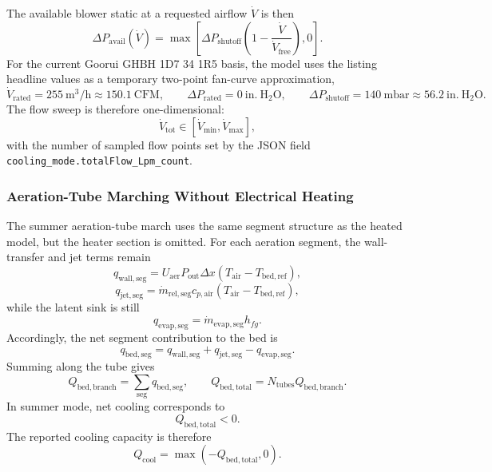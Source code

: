 \documentclass{article}
\begin{document}
The available blower static at a requested airflow $\dot V$ is then
\begin{equation}
\Delta P_{\mathrm{avail}}(\dot V)
=
\max\!\left[
\Delta P_{\mathrm{shutoff}}
\left(1-\frac{\dot V}{\dot V_{\mathrm{free}}}\right),0
\right].
\end{equation}
For the current Goorui GHBH 1D7 34 1R5 basis, the model uses the listing headline values as
a temporary two-point fan-curve approximation,
\begin{equation}
\dot V_{\mathrm{rated}} = 255 \ \mathrm{m^3/h} \approx 150.1 \ \mathrm{CFM},
\qquad
\Delta P_{\mathrm{rated}} = 0 \ \mathrm{in.\ H_2O},
\qquad
\Delta P_{\mathrm{shutoff}} = 140 \ \mathrm{mbar} \approx 56.2 \ \mathrm{in.\ H_2O}.
\end{equation}
The flow sweep is therefore one-dimensional:
\begin{equation}
\dot V_{\mathrm{tot}} \in
\left[\dot V_{\min}, \dot V_{\max}\right],
\end{equation}
with the number of sampled flow points set by the JSON field
\texttt{cooling\_mode.totalFlow\_Lpm\_count}.

\subsubsection{Aeration-Tube Marching Without Electrical Heating}

The summer aeration-tube march uses the same segment structure as the heated
model, but the heater section is omitted. For each aeration segment, the
wall-transfer and jet terms remain
\begin{equation}
q_{\mathrm{wall,seg}}
= U_{\mathrm{aer}} P_{\mathrm{out}} \Delta x
\left(T_{\mathrm{air}} - T_{\mathrm{bed,ref}}\right),
\end{equation}
\begin{equation}
q_{\mathrm{jet,seg}}
= \dot m_{\mathrm{rel,seg}} c_{p,\mathrm{air}}
\left(T_{\mathrm{air}} - T_{\mathrm{bed,ref}}\right),
\end{equation}
while the latent sink is still
\begin{equation}
q_{\mathrm{evap,seg}}
= \dot m_{\mathrm{evap,seg}} h_{fg}.
\end{equation}
Accordingly, the net segment contribution to the bed is
\begin{equation}
q_{\mathrm{bed,seg}}
= q_{\mathrm{wall,seg}} + q_{\mathrm{jet,seg}} - q_{\mathrm{evap,seg}}.
\end{equation}
Summing along the tube gives
\begin{equation}
Q_{\mathrm{bed,branch}}
= \sum_{\mathrm{seg}} q_{\mathrm{bed,seg}},
\qquad
Q_{\mathrm{bed,total}} = N_{\mathrm{tubes}} Q_{\mathrm{bed,branch}}.
\end{equation}
In summer mode, net cooling corresponds to
\begin{equation}
Q_{\mathrm{bed,total}} < 0.
\end{equation}
The reported cooling capacity is therefore
\begin{equation}
Q_{\mathrm{cool}} = \max\!\left(-Q_{\mathrm{bed,total}},0\right).
\end{equation}
\end{document}
